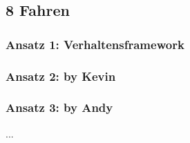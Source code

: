 \subsection{8 Fahren}
\label{8-fahren}

\subsubsection{Ansatz 1: Verhaltensframework}

\subsubsection{Ansatz 2: by Kevin}

\subsubsection{Ansatz 3: by Andy}
...
